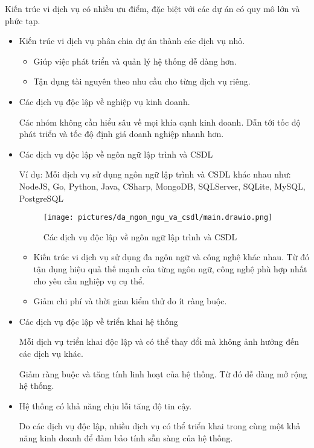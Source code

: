 Kiến trúc vi dịch vụ có nhiều ưu điểm, đặc biệt với các dự án có quy mô lớn và phức tạp.

\begin{itemize}

\item Kiến trúc vi dịch vụ phân chia dự án thành các dịch vụ nhỏ.

\begin{itemize}

\item Giúp việc phát triển và quản lý hệ thống dễ dàng hơn.

\item Tận dụng tài nguyên theo nhu cầu cho từng dịch vụ riêng.

\end{itemize}

\item Các dịch vụ độc lập về nghiệp vụ kinh doanh.

Các nhóm không cần hiểu sâu về mọi khía cạnh kinh doanh. Dẫn tới tốc độ phát triển và tốc độ định giá doanh nghiệp nhanh hơn.

\item Các dịch vụ độc lập về ngôn ngữ lập trình và CSDL

Ví dụ: Mỗi dịch vụ sử dụng ngôn ngữ lập trình và CSDL khác nhau như: NodeJS, Go, Python, Java, CSharp, MongoDB, SQLServer, SQLite, MySQL, PostgreSQL

\begin{figure}[H]

\centering

\texttt{[image: pictures/da\_ngon\_ngu\_va\_csdl/main.drawio.png]}

\caption{Các dịch vụ độc lập về ngôn ngữ lập trình và CSDL}

\end{figure}

\begin{itemize}

\item Kiến trúc vi dịch vụ sử dụng đa ngôn ngữ và công nghệ khác nhau. Từ đó tận dụng hiệu quả thế mạnh của từng ngôn ngữ, công nghệ phù hợp nhất cho yêu cầu nghiệp vụ cụ thể.

\item Giảm chi phí và thời gian kiểm thử do ít ràng buộc.

\end{itemize}

\item Các dịch vụ độc lập về triển khai hệ thống

Mỗi dịch vụ triển khai độc lập và có thể thay đổi mà không ảnh hưởng đến các dịch vụ khác.

Giảm ràng buộc và tăng tính linh hoạt của hệ thống. Từ đó dễ dàng mở rộng hệ thống.

\item Hệ thống có khả năng chịu lỗi tăng độ tin cậy.

Do các dịch vụ độc lập, nhiều dịch vụ có thể triển khai trong cùng một khả năng kinh doanh để đảm bảo tính sẵn sàng của hệ thống.

\end{itemize}



